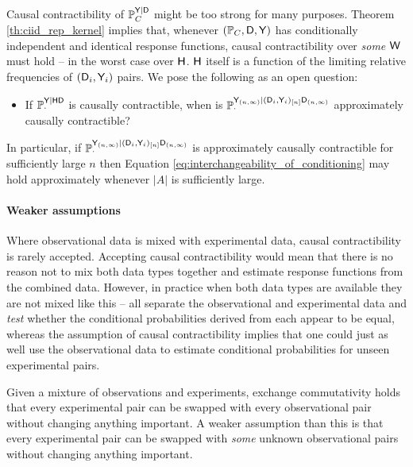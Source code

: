 Causal contractibility of $\mathbb{P}_C^{\mathsf{Y}|\mathsf{D}}$ might be too strong for many purposes. Theorem \ref{th:ciid_rep_kernel} implies that, whenever $(\mathbb{P}_C, \mathsf{D},\mathsf{Y})$ has conditionally independent and identical response functions, causal contractibility over \emph{some} $\mathsf{W}$ must hold -- in the worst case over $\mathsf{H}$. $\mathsf{H}$ itself is a function of the limiting relative frequencies of $(\mathsf{D}_i,\mathsf{Y}_i)$ pairs.  We pose the following as an open question:
\begin{itemize}
    \item If $\mathbb{P}_\cdot^{\mathsf{Y}|\mathsf{HD}}$ is causally contractible, when is $\mathbb{P}_\cdot^{\mathsf{Y}_{(n,\infty)}|(\mathsf{D}_i,\mathsf{Y}_i)_{[n]}\mathsf{D}_{(n,\infty)}}$ approximately causally contractible?
\end{itemize}
In particular, if $\mathbb{P}_\cdot^{\mathsf{Y}_{(n,\infty)}|(\mathsf{D}_i,\mathsf{Y}_i)_{[n]}\mathsf{D}_{(n,\infty)}}$ is approximately causally contractible for sufficiently large $n$ then Equation \ref{eq:interchangeability_of_conditioning} may hold approximately whenever $|A|$ is sufficiently large.

\paragraph{Weaker assumptions}\label{pgph:weaker_assumptions}

Where observational data is mixed with experimental data, causal contractibility is rarely accepted. Accepting causal contractibility would mean that there is no reason not to mix both data types together and estimate response functions from the combined data. However, in practice when both data types are available they are not mixed like this -- \citet{eckles_bias_2021,gordon_comparison_2018,gordon_close_2022} all separate the observational and experimental data and \emph{test} whether the conditional probabilities derived from each appear to be equal, whereas the assumption of causal contractibility implies that one could just as well use the observational data to estimate conditional probabilities for unseen experimental pairs.

Given a mixture of observations and experiments, exchange commutativity holds that every experimental pair can be swapped with every observational pair without changing anything important. A weaker assumption than this is that every experimental pair can be swapped with \emph{some} unknown observational pairs without changing anything important. 

